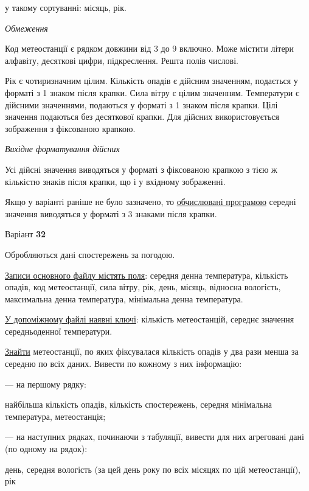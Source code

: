 \documentclass[11pt, ukrainian]{article}
\begin{document}
{\noindent}у такому сортуванні: місяць, рік.


\bigskip\textit{Обмеження}

Код метеостанції є рядком довжини від 3 до 9 включно.
Може містити літери алфавіту, десяткові цифри, підкреслення. Решта полів числові.

Рік є чотиризначним цілим.
Кількість опадів є дійсним значенням, подається у форматі з 1 знаком після крапки.
Сила вітру є цілим значенням.
Температури є дійсними значеннями, подаються у форматі з 1 знаком після крапки.
Цілі значення подаються без десяткової крапки.
Для дійсних використовується зображення з фіксованою крапкою.

\textit{Вихідне форматування дійсних}

Усі дійсні значення виводяться у форматі з фіксованою крапкою з тією ж кількістю знаків після крапки, що і у вхідному зображенні.

Якщо у варіанті раніше не було зазначено, то \underline{обчислювані програмою} середні значення виводяться у форматі з 3 знаками після крапки.


\par
\newpage
{\center Варіант  \No \textbf { 32 }\par}
\bigskip
Обробляються дані спостережень за погодою. 

\underline{Записи основного файлу містять поля}: середня денна температура, кількість опадів, код метеостанції, сила вітру, рік, день, місяць, відносна вологість, максимальна денна температура, мінімальна денна температура.

\underline{У допоміжному файлі наявні ключі}: кількість метеостанцій, середнє значення середньоденної температури.

\underline{Знайти} метеостанції, по яких фіксувалася кількість опадів у два рази менша за середню по всіх даних. Вивести по кожному з них інформацію:\par
{\noindent}--- на першому рядку:\par
найбільша кількість опадів, кількість спостережень, середня мінімальна температура, метеостанція;

{\noindent}--- на наступних рядках, починаючи з табуляції, вивести для них агреговані дані (по одному на рядок):\par
день, середня вологість (за цей день року по всіх місяцях по цій метеостанції), рік
\end{document}
